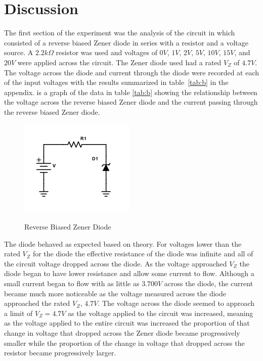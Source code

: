 \documentclass{amsart}
\begin{document}
\section*{Discussion}
The first section of the experiment was the analysis of the circuit in  which consisted of a reverse biased Zener diode in series with a resistor and a voltage source.  A $2.2k\Omega$ resistor was used and voltages of $0V$, $1V$, $2V$, $5V$, $10V$, $15V$, and $20V$ were applied across the circuit.  The Zener diode used had a rated $V_Z$ of $4.7V$.  The voltage across the diode and current through the diode were recorded at each of the input voltages with the results summarized in table~\ref{tab:b} in the appendix.  is a graph of the data in table \ref{tab:b} showing the relationship between the voltage across the reverse biased Zener diode and the current passing through the reverse biased Zener diode.
\begin{figure}[H]
\caption{Reverse Biased Zener Diode}
\includegraphics[width=\textwidth]{L2F1.png}
\label{fig:basic}
\end{figure}
The diode behaved as expected based on theory.  For voltages lower than the rated $V_Z$ for the diode the effective resistance of the diode was infinite and all of the circuit voltage dropped across the diode.  As the voltage approached $V_Z$ the diode began to have lower resistance and allow some current to flow.  Although a small current began to flow with as little as $3.700V$ across the diode, the current became much more noticeable as the voltage measured across the diode approached the rated $V_Z$, $4.7V$.  The voltage across the diode seemed to approach a limit of $V_Z=4.7V$ as the voltage applied to the circuit was increased, meaning as the voltage applied to the entire circuit was increased the proportion of that change in voltage that dropped across the Zener diode became progressively smaller while the proportion of the change in voltage that dropped across the resistor became progressively larger.
\end{document}
